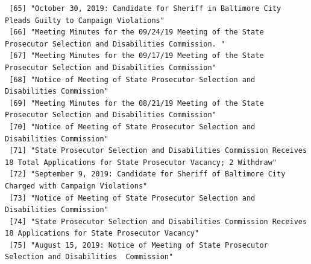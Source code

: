 \documentclass[
  letterpaper,
  DIV=11,
  numbers=noendperiod]{scrreprt}
\begin{document}
\begin{verbatim}
 [65] "October 30, 2019: Candidate for Sheriff in Baltimore City Pleads Guilty to Campaign Violations"                                                                                                                                                      
 [66] "Meeting Minutes for the 09/24/19 Meeting of the State Prosecutor Selection and Disabilities Commission. "                                                                                                                                            
 [67] "Meeting Minutes for the 09/17/19 Meeting of the State Prosecutor Selection and Disabilities Commission"                                                                                                                                              
 [68] "Notice of Meeting of State Prosecutor Selection and Disabilities Commission"                                                                                                                                                                         
 [69] "Meeting Minutes for the 08/21/19 Meeting of the State Prosecutor Selection and Disabilities Commission"                                                                                                                                              
 [70] "Notice of Meeting of State Prosecutor Selection and Disabilities Commission"                                                                                                                                                                         
 [71] "State Prosecutor Selection and Disabilities Commission Receives 18 Total Applications for State Prosecutor Vacancy; 2 Withdraw"                                                                                                                      
 [72] "September 9, 2019: Candidate for Sheriff of Baltimore City Charged with Campaign Violations"                                                                                                                                                         
 [73] "Notice of Meeting of State Prosecutor Selection and Disabilities Commission"                                                                                                                                                                         
 [74] "State Prosecutor Selection and Disabilities Commission Receives 18 Applications for State Prosecutor Vacancy"                                                                                                                                        
 [75] "August 15, 2019: Notice of Meeting of State Prosecutor Selection and Disabilities  Commission"                                                                                                                                                       

\end{verbatim}
\end{document}
